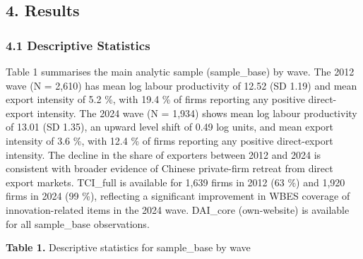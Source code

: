 \documentclass[
  12pt,a4paper]{article}
\begin{document}
\hypertarget{results}{%
\subsection{4. Results}\label{results}}

\hypertarget{descriptive-statistics}{%
\subsubsection{4.1 Descriptive
Statistics}\label{descriptive-statistics}}

Table 1 summarises the main analytic sample (sample\_base) by wave. The
2012 wave (N = 2,610) has mean log labour productivity of 12.52 (SD
1.19) and mean export intensity of 5.2 \%, with 19.4 \% of firms
reporting any positive direct-export intensity. The 2024 wave (N =
1,934) shows mean log labour productivity of 13.01 (SD 1.35), an upward
level shift of 0.49 log units, and mean export intensity of 3.6 \%, with
12.4 \% of firms reporting any positive direct-export intensity. The
decline in the share of exporters between 2012 and 2024 is consistent
with broader evidence of Chinese private-firm retreat from direct export
markets. TCI\_full is available for 1,639 firms in 2012 (63 \%) and
1,920 firms in 2024 (99 \%), reflecting a significant improvement in
WBES coverage of innovation-related items in the 2024 wave. DAI\_core
(own-website) is available for all sample\_base observations.

\textbf{Table 1.} Descriptive statistics for sample\_base by wave
\end{document}
